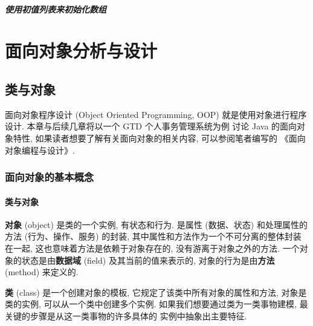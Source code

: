 \documentclass[10pt,UTF8]{book} %
\begin{document}
\subsubsection{使用初值列表来初始化数组}



\part{面向对象分析与设计}

\chapter{类与对象}

面向对象程序设计 (Object Oriented Programming, OOP)
就是使用对象进行程序设计. 本章与后续几章将以一个 GTD 个人事务管理系统为例
讨论 Java 的面向对象特性,
如果读者想要了解有关面向对象的相关内容, 可以参阅笔者编写的
《面向对象编程与设计》.

\section{面向对象的基本概念}

\subsection{类与对象}

\textbf{对象} (object) 是类的一个实例, 有状态和行为. 是属性 (数据、状态) 和处理属性的方法 
(行为、操作、服务) 的封装, 其中属性和方法作为一个不可分离的整体封装在一起, 
这也意味着方法是依赖于对象存在的, 没有游离于对象之外的方法.
一个对象的状态是由\textbf{数据域} (field) 及其当前的值来表示的,
对象的行为是由\textbf{方法} (method) 来定义的.

\textbf{类} (class) 是一个创建对象的模板, 它规定了该类中所有对象的属性和方法, 
对象是类的实例, 可以从一个类中创建多个实例.
如果我们想要通过类为一类事物建模, 最关键的步骤是从这一类事物的许多具体的
实例中抽象出主要特征.
\end{document}
